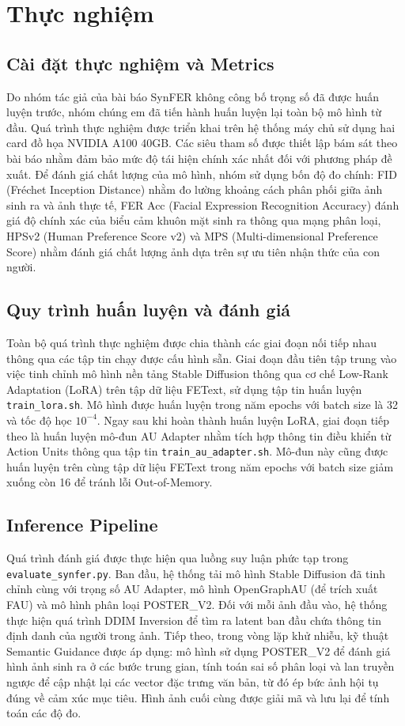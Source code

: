 \section{Thực nghiệm}

\subsection{Cài đặt thực nghiệm và Metrics}
Do nhóm tác giả của bài báo SynFER không công bố trọng số đã được huấn luyện trước, nhóm chúng em đã tiến hành huấn luyện lại toàn bộ mô hình từ đầu. Quá trình thực nghiệm được triển khai trên hệ thống máy chủ sử dụng hai card đồ họa NVIDIA A100 40GB. Các siêu tham số được thiết lập bám sát theo bài báo nhằm đảm bảo mức độ tái hiện chính xác nhất đối với phương pháp đề xuất. Để đánh giá chất lượng của mô hình, nhóm sử dụng bốn độ đo chính: FID (Fréchet Inception Distance) nhằm đo lường khoảng cách phân phối giữa ảnh sinh ra và ảnh thực tế, FER Acc (Facial Expression Recognition Accuracy) đánh giá độ chính xác của biểu cảm khuôn mặt sinh ra thông qua mạng phân loại, HPSv2 (Human Preference Score v2) và MPS (Multi-dimensional Preference Score) nhằm đánh giá chất lượng ảnh dựa trên sự ưu tiên nhận thức của con người.

\subsection{Quy trình huấn luyện và đánh giá}
Toàn bộ quá trình thực nghiệm được chia thành các giai đoạn nối tiếp nhau thông qua các tập tin chạy được cấu hình sẵn. Giai đoạn đầu tiên tập trung vào việc tinh chỉnh mô hình nền tảng Stable Diffusion thông qua cơ chế Low-Rank Adaptation (LoRA) trên tập dữ liệu FEText, sử dụng tập tin huấn luyện \texttt{train\_lora.sh}. Mô hình được huấn luyện trong năm epochs với batch size là 32 và tốc độ học $10^{-4}$. Ngay sau khi hoàn thành huấn luyện LoRA, giai đoạn tiếp theo là huấn luyện mô-đun AU Adapter nhằm tích hợp thông tin điều khiển từ Action Units thông qua tập tin \texttt{train\_au\_adapter.sh}. Mô-đun này cũng được huấn luyện trên cùng tập dữ liệu FEText trong năm epochs với batch size giảm xuống còn 16 để tránh lỗi Out-of-Memory.

\subsection{Inference Pipeline}
Quá trình đánh giá được thực hiện qua luồng suy luận phức tạp trong \texttt{evaluate\_synfer.py}. Ban đầu, hệ thống tải mô hình Stable Diffusion đã tinh chỉnh cùng với trọng số AU Adapter, mô hình OpenGraphAU (để trích xuất FAU) và mô hình phân loại POSTER\_V2. Đối với mỗi ảnh đầu vào, hệ thống thực hiện quá trình DDIM Inversion để tìm ra latent ban đầu chứa thông tin định danh của người trong ảnh. Tiếp theo, trong vòng lặp khử nhiễu, kỹ thuật Semantic Guidance được áp dụng: mô hình sử dụng POSTER\_V2 để đánh giá hình ảnh sinh ra ở các bước trung gian, tính toán sai số phân loại và lan truyền ngược để cập nhật lại các vector đặc trưng văn bản, từ đó ép bức ảnh hội tụ đúng về cảm xúc mục tiêu. Hình ảnh cuối cùng được giải mã và lưu lại để tính toán các độ đo.

